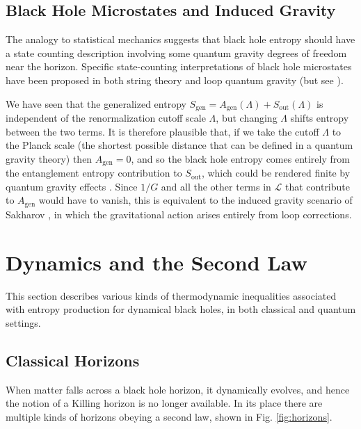 \documentclass[12pt,a4paper]{article}
\begin{document}
\subsection{Black Hole Microstates and Induced Gravity}\label{sec:induced}

The analogy to statistical mechanics suggests that black hole entropy should have a state counting description involving some quantum gravity degrees of freedom near the horizon.  Specific state-counting interpretations of black hole microstates have been proposed in both string theory \cite{Strominger:1996sh,Breckenridge:1996sn,Horowitz:1996nw,Sen:2007qy} and loop quantum gravity \cite{Ashtekar:1997yu,Meissner:2004ju,Bianchi:2012ui} (but see \cite{Jacobson:2007uj}).

We have seen that the generalized entropy $S_\mathrm{gen} = A_\mathrm{gen}(\Lambda) + S_\mathrm{out}(\Lambda)$ is independent of the renormalization cutoff scale $\Lambda$, but changing $\Lambda$ shifts entropy between the two terms.  It is therefore plausible that, if we take the cutoff $\Lambda$ to the Planck scale (the shortest possible distance that can be defined in a quantum gravity theory) then $A_\mathrm{gen} = 0$, and so the black hole entropy comes entirely from the entanglement entropy contribution to $S_\mathrm{out}$, which could be rendered finite by quantum gravity effects \cite{Sorkin:2014kta}.  Since $1/G$ and all the other terms in $\mathcal{L}$ that contribute to $A_\mathrm{gen}$ would have to vanish, this is equivalent \cite{susskind1994black,jacobson1994black,Frolov:1996aj} to the induced gravity scenario of Sakharov \cite{sakharov1968vacuum}, in which the gravitational action arises entirely from loop corrections.

\section{Dynamics and the Second Law}\label{sec:2nd}

This section describes various kinds of thermodynamic inequalities associated with entropy production for dynamical black holes, in both classical and quantum settings.

\subsection{Classical Horizons}

When matter falls across a black hole horizon, it dynamically evolves, and hence the notion of a Killing horizon is no longer available.  In its place there are multiple kinds of horizons obeying a second law, shown in Fig. \ref{fig:horizons}.
\end{document}
